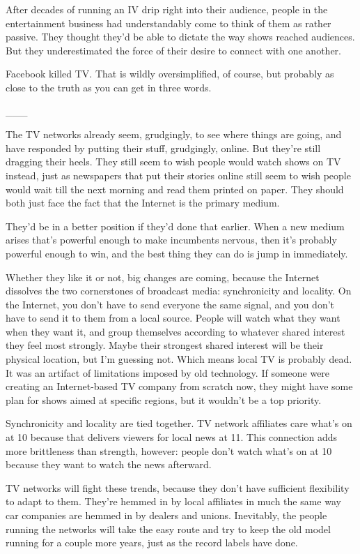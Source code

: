 \documentclass[12pt]{book}
\begin{document}
After decades of running an IV drip right into their audience, people in
the entertainment business had understandably come to think of them as
rather passive. They thought they'd be able to dictate the way shows
reached audiences. But they underestimated the force of their desire to
connect with one another.

Facebook killed TV. That is wildly oversimplified, of course, but
probably as close to the truth as you can get in three words.

\_\_\_

The TV networks already seem, grudgingly, to see where things are going,
and have responded by putting their stuff, grudgingly, online. But
they're still dragging their heels. They still seem to wish people would
watch shows on TV instead, just as newspapers that put their stories
online still seem to wish people would wait till the next morning and
read them printed on paper. They should both just face the fact that the
Internet is the primary medium.

They'd be in a better position if they'd done that earlier. When a new
medium arises that's powerful enough to make incumbents nervous, then
it's probably powerful enough to win, and the best thing they can do is
jump in immediately.

Whether they like it or not, big changes are coming, because the
Internet dissolves the two cornerstones of broadcast media:
synchronicity and locality. On the Internet, you don't have to send
everyone the same signal, and you don't have to send it to them from a
local source. People will watch what they want when they want it, and
group themselves according to whatever shared interest they feel most
strongly. Maybe their strongest shared interest will be their physical
location, but I'm guessing not. Which means local TV is probably dead.
It was an artifact of limitations imposed by old technology. If someone
were creating an Internet-based TV company from scratch now, they might
have some plan for shows aimed at specific regions, but it wouldn't be a
top priority.

Synchronicity and locality are tied together. TV network affiliates care
what's on at 10 because that delivers viewers for local news at 11. This
connection adds more brittleness than strength, however: people don't
watch what's on at 10 because they want to watch the news afterward.

TV networks will fight these trends, because they don't have sufficient
flexibility to adapt to them. They're hemmed in by local affiliates in
much the same way car companies are hemmed in by dealers and unions.
Inevitably, the people running the networks will take the easy route and
try to keep the old model running for a couple more years, just as the
record labels have done.
\end{document}
